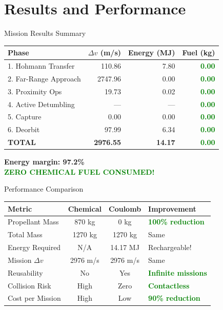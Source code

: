 \documentclass[aspectratio=169]{beamer}
\begin{document}
\section{Results and Performance}

\begin{frame}{Mission Results Summary}
\begin{table}
\small
\begin{tabular}{lrrr}
\toprule
\textbf{Phase} & \textbf{$\Delta v$ (m/s)} & \textbf{Energy (MJ)} & \textbf{Fuel (kg)} \\
\midrule
1. Hohmann Transfer & 110.86 & 7.80 & \textcolor{green}{\textbf{0.00}} \\
2. Far-Range Approach & 2747.96 & 0.00 & \textcolor{green}{\textbf{0.00}} \\
3. Proximity Ops & 19.73 & 0.02 & \textcolor{green}{\textbf{0.00}} \\
4. Active Detumbling & --- & --- & \textcolor{green}{\textbf{0.00}} \\
5. Capture & 0.00 & 0.00 & \textcolor{green}{\textbf{0.00}} \\
6. Deorbit & 97.99 & 6.34 & \textcolor{green}{\textbf{0.00}} \\
\midrule
\textbf{TOTAL} & \textbf{2976.55} & \textbf{14.17} & \textcolor{green}{\textbf{0.00}} \\
\bottomrule
\end{tabular}
\end{table}

\vspace{1em}
\begin{center}
\Large\textbf{Energy margin: 97.2\%}\\
\Large\textcolor{green}{\textbf{ZERO CHEMICAL FUEL CONSUMED!}}
\end{center}
\end{frame}

\begin{frame}{Performance Comparison}
\begin{table}
\scriptsize
\begin{tabular}{lccl}
\toprule
\textbf{Metric} & \textbf{Chemical} & \textbf{Coulomb} & \textbf{Improvement} \\
\midrule
Propellant Mass & 870 kg & 0 kg & \textcolor{green}{\textbf{100\% reduction}} \\
Total Mass & 1270 kg & 1270 kg & Same \\
Energy Required & N/A & 14.17 MJ & Rechargeable! \\
Mission $\Delta v$ & 2976 m/s & 2976 m/s & Same \\
Reusability & No & Yes & \textcolor{green}{\textbf{Infinite missions}} \\
Collision Risk & High & Zero & \textcolor{green}{\textbf{Contactless}} \\
Cost per Mission & High & Low & \textcolor{green}{\textbf{90\% reduction}} \\
\bottomrule
\end{tabular}
\end{table}
\end{frame}
\end{document}
